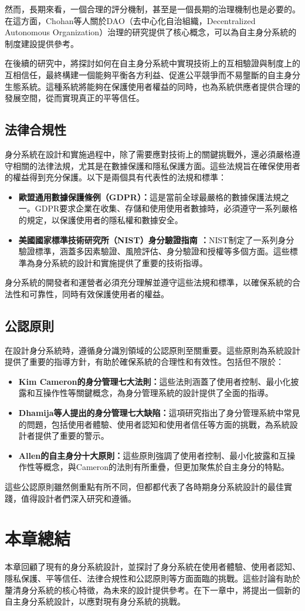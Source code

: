 然而，長期來看，一個合理的評分機制，甚至是一個長期的治理機制也是必要的。在這方面，Chohan等人\cite{chohan2024decentralized}關於DAO（去中心化自治組織，Decentralized Autonomous Organization）治理的研究提供了核心概念，可以為自主身分系統的制度建設提供參考。

在後續的研究中，將探討如何在自主身分系統中實現技術上的互相驗證與制度上的互相信任，最終構建一個能夠平衡各方利益、促進公平競爭而不易壟斷的自主身分生態系統。這種系統將能夠在保護使用者權益的同時，也為系統供應者提供合理的發展空間，從而實現真正的平等信任。
\subsection{法律合規性}
身分系統在設計和實施過程中，除了需要應對技術上的關鍵挑戰外，還必須嚴格遵守相關的法律法規，尤其是在數據保護和隱私保護方面。這些法規旨在確保使用者的權益得到充分保護。以下是兩個具有代表性的法規和標準：
\begin{itemize}
  \item \textbf{歐盟通用數據保護條例（GDPR）\cite{GDPR2016}：}這是當前全球最嚴格的數據保護法規之一。GDPR要求企業在收集、存儲和使用使用者數據時，必須遵守一系列嚴格的規定，以保護使用者的隱私權和數據安全。
  \item \textbf{美國國家標準技術研究所（NIST）身分驗證指南 \cite{NIST800-63-3}：}NIST制定了一系列身分驗證標準，涵蓋多因素驗證、風險評估、身分驗證和授權等多個方面。這些標準為身分系統的設計和實施提供了重要的技術指導。
\end{itemize}
身分系統的開發者和運營者必須充分理解並遵守這些法規和標準，以確保系統的合法性和可靠性，同時有效保護使用者的權益。
\subsection{公認原則}
在設計身分系統時，遵循身分識別領域的公認原則至關重要。這些原則為系統設計提供了重要的指導方針，有助於確保系統的合理性和有效性。包括但不限於：
\begin{itemize}
  \item \textbf{Kim Cameron的身分管理七大法則\cite{cameron2005laws}：}這些法則涵蓋了使用者控制、最小化披露和互操作性等關鍵概念，為身分管理系統的設計提供了全面的指導。
  \item \textbf{Dhamija等人提出的身分管理七大缺陷\cite{dhamija2008sevenflaws}：}這項研究指出了身分管理系統中常見的問題，包括使用者體驗、使用者認知和使用者信任等方面的挑戰，為系統設計者提供了重要的警示。
  \item \textbf{Allen的自主身分十大原則\cite{allen2016selfsovereign}：}這些原則強調了使用者控制、最小化披露和互操作性等概念，與Cameron的法則有所重疊，但更加聚焦於自主身分的特點。
\end{itemize}
這些公認原則雖然側重點有所不同，但都都代表了各時期身分系統設計的最佳實踐，值得設計者們深入研究和遵循。
\section{本章總結}
本章回顧了現有的身分系統設計，並探討了身分系統在使用者體驗、使用者認知、隱私保護、平等信任、法律合規性和公認原則等方面面臨的挑戰。這些討論有助於釐清身分系統的核心特徵，為未來的設計提供參考。在下一章中，將提出一個新的自主身分系統設計，以應對現有身分系統的挑戰。
